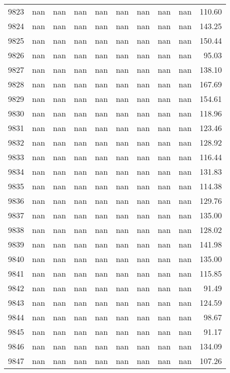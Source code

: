 \begin{tabular}{lrrrrrrrrr}
9823 & nan & nan & nan & nan & nan & nan & nan & nan & 110.60 \\
9824 & nan & nan & nan & nan & nan & nan & nan & nan & 143.25 \\
9825 & nan & nan & nan & nan & nan & nan & nan & nan & 150.44 \\
9826 & nan & nan & nan & nan & nan & nan & nan & nan & 95.03 \\
9827 & nan & nan & nan & nan & nan & nan & nan & nan & 138.10 \\
9828 & nan & nan & nan & nan & nan & nan & nan & nan & 167.69 \\
9829 & nan & nan & nan & nan & nan & nan & nan & nan & 154.61 \\
9830 & nan & nan & nan & nan & nan & nan & nan & nan & 118.96 \\
9831 & nan & nan & nan & nan & nan & nan & nan & nan & 123.46 \\
9832 & nan & nan & nan & nan & nan & nan & nan & nan & 128.92 \\
9833 & nan & nan & nan & nan & nan & nan & nan & nan & 116.44 \\
9834 & nan & nan & nan & nan & nan & nan & nan & nan & 131.83 \\
9835 & nan & nan & nan & nan & nan & nan & nan & nan & 114.38 \\
9836 & nan & nan & nan & nan & nan & nan & nan & nan & 129.76 \\
9837 & nan & nan & nan & nan & nan & nan & nan & nan & 135.00 \\
9838 & nan & nan & nan & nan & nan & nan & nan & nan & 128.02 \\
9839 & nan & nan & nan & nan & nan & nan & nan & nan & 141.98 \\
9840 & nan & nan & nan & nan & nan & nan & nan & nan & 135.00 \\
9841 & nan & nan & nan & nan & nan & nan & nan & nan & 115.85 \\
9842 & nan & nan & nan & nan & nan & nan & nan & nan & 91.49 \\
9843 & nan & nan & nan & nan & nan & nan & nan & nan & 124.59 \\
9844 & nan & nan & nan & nan & nan & nan & nan & nan & 98.67 \\
9845 & nan & nan & nan & nan & nan & nan & nan & nan & 91.17 \\
9846 & nan & nan & nan & nan & nan & nan & nan & nan & 134.09 \\
9847 & nan & nan & nan & nan & nan & nan & nan & nan & 107.26 \\

\end{tabular}
